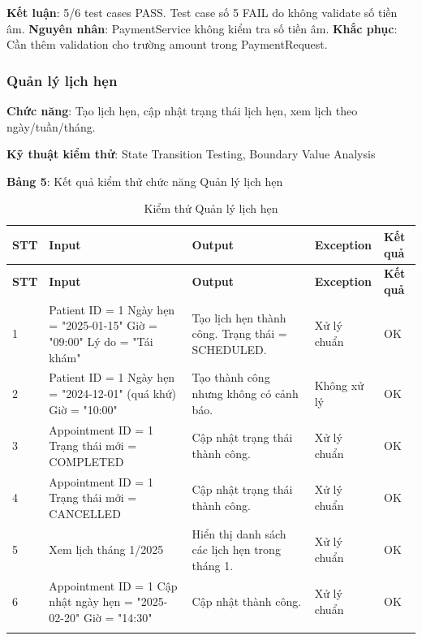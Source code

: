 \textbf{Kết luận}: 5/6 test cases PASS. Test case số 5 FAIL do không validate số tiền âm. \textbf{Nguyên nhân}: PaymentService không kiểm tra số tiền âm. \textbf{Khắc phục}: Cần thêm validation cho trường amount trong PaymentRequest.

\subsubsection{Quản lý lịch hẹn}

\textbf{Chức năng}: Tạo lịch hẹn, cập nhật trạng thái lịch hẹn, xem lịch theo ngày/tuần/tháng.

\textbf{Kỹ thuật kiểm thử}: State Transition Testing, Boundary Value Analysis

\textbf{Bảng 5}: Kết quả kiểm thử chức năng Quản lý lịch hẹn

\begin{longtable}{|p{1cm}|p{5cm}|p{4cm}|p{3cm}|p{1.5cm}|}
\hline
\textbf{STT} & \textbf{Input} & \textbf{Output} & \textbf{Exception} & \textbf{Kết quả} \\
\hline
\endfirsthead

\hline
\textbf{STT} & \textbf{Input} & \textbf{Output} & \textbf{Exception} & \textbf{Kết quả} \\
\hline
\endhead

\hline
\endfoot

1 & Patient ID = 1 \newline Ngày hẹn = "2025-01-15" \newline Giờ = "09:00" \newline Lý do = "Tái khám" & Tạo lịch hẹn thành công. Trạng thái = SCHEDULED. & Xử lý chuẩn & OK \\
\hline

2 & Patient ID = 1 \newline Ngày hẹn = "2024-12-01" (quá khứ) \newline Giờ = "10:00" & Tạo thành công nhưng không có cảnh báo. & Không xử lý & OK \\
\hline

3 & Appointment ID = 1 \newline Trạng thái mới = COMPLETED & Cập nhật trạng thái thành công. & Xử lý chuẩn & OK \\
\hline

4 & Appointment ID = 1 \newline Trạng thái mới = CANCELLED & Cập nhật trạng thái thành công. & Xử lý chuẩn & OK \\
\hline

5 & Xem lịch tháng 1/2025 & Hiển thị danh sách các lịch hẹn trong tháng 1. & Xử lý chuẩn & OK \\
\hline

6 & Appointment ID = 1 \newline Cập nhật ngày hẹn = "2025-02-20" \newline Giờ = "14:30" & Cập nhật thành công. & Xử lý chuẩn & OK \\
\hline

\caption{Kiểm thử Quản lý lịch hẹn}
\end{longtable}

